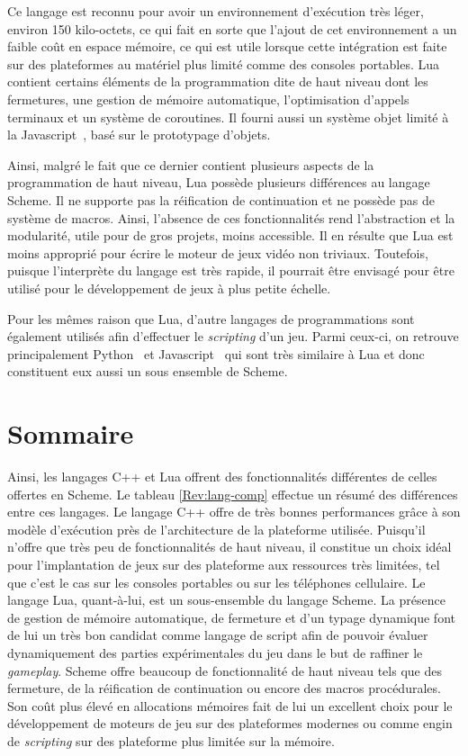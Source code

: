 \documentclass[12pt,oneside,letterpaper,francais]{book}
\begin{document}
Ce langage est reconnu pour avoir un environnement d'exécution très
léger, environ 150 kilo-octets, ce qui fait en sorte que l'ajout de
cet environnement a un faible coût en espace mémoire, ce qui est utile
lorsque cette intégration est faite sur des plateformes au matériel
plus limité comme des consoles portables. Lua contient certains
éléments de la programmation dite de haut niveau dont les fermetures,
une gestion de mémoire automatique, l'optimisation d'appels terminaux
et un système de coroutines. Il fourni aussi un système objet limité à
la Javascript~\cite{ECMA-262}, basé sur le prototypage d'objets.

Ainsi, malgré le fait que ce dernier contient plusieurs aspects de la
programmation de haut niveau, Lua possède plusieurs différences au
langage Scheme. Il ne supporte pas la réification de continuation et
ne possède pas de système de macros. Ainsi, l'absence de ces
fonctionnalités rend l'abstraction et la modularité, utile pour de
gros projets, moins accessible. Il en résulte que Lua est moins
approprié pour écrire le moteur de jeux vidéo non triviaux. Toutefois,
puisque l'interprète du langage est très rapide, il pourrait être
envisagé pour être utilisé pour le développement de jeux à plus petite
échelle.

Pour les mêmes raison que Lua, d'autre langages de programmations sont
également utilisés afin d'effectuer le \textit{scripting} d'un
jeu. Parmi ceux-ci, on retrouve principalement Python~\cite{Python} et
Javascript~\cite{ECMA-262} qui sont très similaire à Lua et donc
constituent eux aussi un sous ensemble de Scheme.

\section{Sommaire}
Ainsi, les langages C++ et Lua offrent des fonctionnalités différentes
de celles offertes en Scheme. Le tableau \ref{Rev:lang-comp} effectue
un résumé des différences entre ces langages. Le langage C++ offre de
très bonnes performances grâce à son modèle d'exécution près de
l'architecture de la plateforme utilisée. Puisqu'il n'offre que très
peu de fonctionnalités de haut niveau, il constitue un choix idéal
pour l'implantation de jeux sur des plateforme aux ressources très
limitées, tel que c'est le cas sur les consoles portables ou sur les
téléphones cellulaire. Le langage Lua, quant-à-lui, est un
sous-ensemble du langage Scheme. La présence de gestion de mémoire
automatique, de fermeture et d'un typage dynamique font de lui un très
bon candidat comme langage de script afin de pouvoir évaluer
dynamiquement des parties expérimentales du jeu dans le but de
raffiner le \textit{gameplay}. Scheme offre beaucoup de fonctionnalité
de haut niveau tels que des fermeture, de la réification de
continuation ou encore des macros procédurales. Son coût plus élevé en
allocations mémoires fait de lui un excellent choix pour le
développement de moteurs de jeu sur des plateformes modernes ou comme
engin de \textit{scripting} sur des plateforme plus limitée sur la
mémoire.
\end{document}
